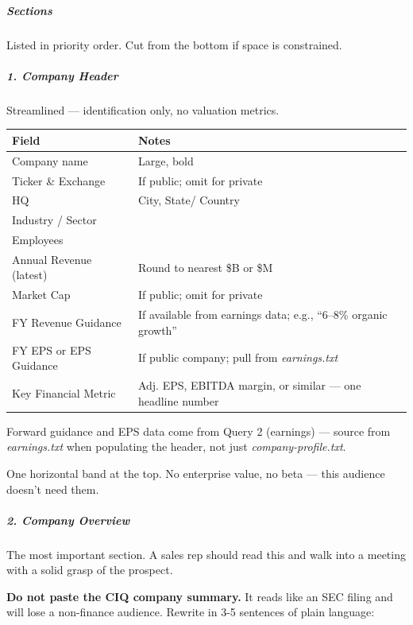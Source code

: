 \documentclass[11pt]{article}
\begin{document}
\subparagraph{Sections}\mbox{}\par

Listed in priority order. Cut from the bottom if space is constrained.


\subparagraph{1. Company Header}\mbox{}\par
Streamlined — identification only, no valuation metrics.


\begingroup
\small
\setlength{\tabcolsep}{2pt}
\begin{longtable}{>{\RaggedRight\arraybackslash\hspace{0pt}}p{}>{\RaggedRight\arraybackslash\hspace{0pt}}p{}}
\toprule
{} \textbf{Field} & \textbf{Notes} \\
\midrule
{} Company name & Large, bold \\
{} Ticker \& Exchange & If public; omit for private \\
{} HQ & City, State/ Country \\
{} Industry /  Sector &  \\
{} Employees &  \\
{} Annual Revenue (latest) & Round to nearest \$B or \$M \\
{} Market Cap & If public; omit for private \\
{} FY Revenue Guidance & If available from earnings data; e.g., ``6–8\% organic growth'' \\
{} FY EPS or EPS Guidance & If public company; pull from \emph{earnings.txt} \\
{} Key Financial Metric & Adj. EPS, EBITDA margin, or similar — one headline number \\
\bottomrule
\end{longtable}
\endgroup

Forward guidance and EPS data come from Query 2 (earnings) — source from \emph{earnings.txt} when populating the header, not just \emph{company-profile.txt}.


One horizontal band at the top. No enterprise value, no beta — this audience doesn't need them.


\subparagraph{2. Company Overview}\mbox{}\par
The most important section. A sales rep should read this and walk into a meeting with a solid grasp of the prospect.


\textbf{Do not paste the CIQ company summary.} It reads like an SEC filing and will lose a non-finance audience. Rewrite in 3-5 sentences of plain language:
\end{document}
